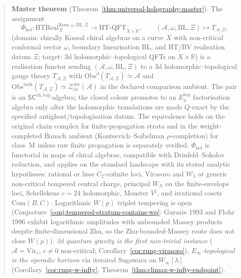 \documentclass[11pt]{memoir}
\newcommand{\cA}{\mathcal{A}}
\newcommand{\R}{\mathbb{R}}
\providecommand{\cW}{\mathcal{W}}
\providecommand{\cZ}{\mathcal{Z}}
\newcommand{\SCchtop}{{\mathsf{SC}^{\mathrm{ch,top}}}}
\begin{document}
\begin{abstract}
\noindent
\textbf{Master theorem}
(Theorem~\ref{thm:universal-holography-master}).
The assignment
\[
 \Phi_{\mathrm{hol}}\colon
 \mathrm{HTReal}^{\mathrm{Kosz},\omega,\mathrm{BL},\Xi}_{X}
 \longrightarrow
 \mathrm{HT\text{-}QFT}_{X \times \R},
 \qquad
 (\cA,\omega,\mathrm{BL},\Xi) \longmapsto T_{\cA,\Xi},
\]
(domain: chirally Koszul chiral algebras on a curve $X$ with
non-critical conformal vector $\omega$, boundary linearisation BL,
and HT/BV realisation datum $\Xi$; target: 3d
holomorphic--topological QFTs on $X \times \R$)
is a realisation functor sending
$(\cA,\omega,\mathrm{BL},\Xi)$ to a 3d holomorphic--topological
gauge theory $T_{\cA,\Xi}$ with
$\mathrm{Obs}^\partial(T_{\cA,\Xi}) \simeq \cA$ and
$\mathrm{Obs}^{\mathrm{bulk}}(T_{\cA,\Xi}) \simeq
\cZ^{\mathrm{der}}_{\mathrm{ch}}(\cA)$ in the declared comparison
ambient.  The pair is an $\SCchtop$-algebra; the closed colour
promotes to an $E_3^{\mathrm{top}}$ factorisation algebra only after
the holomorphic translations are made $Q$-exact by the specified
antighost/topologisation datum.  The equivalence holds on the original
chain complex for finite-propagation strata and in the
weight-completed Banach ambient (Kontsevich--Soibelman $\rho$-completion)
for class~M unless raw finite propagation is separately verified.
$\Phi_{\mathrm{hol}}$ is functorial in maps of chiral algebras,
compatible with Drinfeld--Sokolov reduction, and applies on the
standard landscape with its stated analytic hypotheses: rational or
lisse $C_2$-cofinite loci, Virasoro and $\cW_3$ at generic
non-critical tempered central charge, principal $W_N$ on the
finite-envelope loci, Schellekens $c=24$ holomorphic, Monster
$V^\natural$, and irrational cosets $\mathrm{Com}(B,C)$.
Logarithmic $W(p)$ triplet tempering is open
(Conjecture~\ref{conj:tempered-stratum-contains-wp}:
Gurarie 1993 and Flohr 1996 exhibit logarithmic amplitudes
with unbounded Massey products despite finite-dimensional Zhu,
so the Zhu-bounded-Massey route does not close $W(p)$).
\emph{3d quantum gravity is the first non-trivial instance}
($\cA = \mathrm{Vir}_c$, $c \neq 0$ non-critical;
Corollary~\ref{cor:rung-virasoro}).
\emph{$E_\infty$-topological is the operadic horizon} via
iterated Sugawara on $W_\infty[\lambda]$
(Corollary~\ref{cor:rung-w-infty},
Theorem~\ref{thm:climax-w-infty-endpoint}).


\end{abstract}
\end{document}
